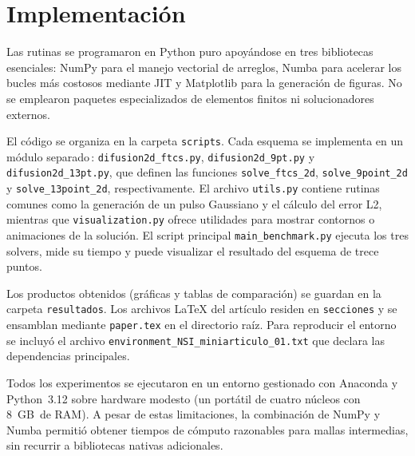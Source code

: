 \section{Implementaci\'on}
Las rutinas se programaron en Python puro apoy\'andose en tres bibliotecas
esenciales: NumPy para el manejo vectorial de arreglos, Numba para acelerar
los bucles m\'as costosos mediante JIT y Matplotlib para la generaci\'on de
figuras.  No se emplearon paquetes especializados de elementos finitos ni
solucionadores externos.

El c\'odigo se organiza en la carpeta \texttt{scripts}.  Cada esquema se
implementa en un m\'odulo separado\,: \texttt{difusion2d\_ftcs.py},
\texttt{difusion2d\_9pt.py} y \texttt{difusion2d\_13pt.py}, que definen las
funciones \texttt{solve\_ftcs\_2d}, \texttt{solve\_9point\_2d} y
\texttt{solve\_13point\_2d}, respectivamente.  El archivo
\texttt{utils.py} contiene rutinas comunes como la generaci\'on de un pulso
Gaussiano y el c\'alculo del error L2, mientras que
\texttt{visualization.py} ofrece utilidades para mostrar contornos o
animaciones de la soluci\'on.  El script principal
\texttt{main\_benchmark.py} ejecuta los tres solvers, mide su tiempo y puede
visualizar el resultado del esquema de trece puntos.

Los productos obtenidos (gr\'aficas y tablas de comparaci\'on) se guardan en la
carpeta \texttt{resultados}.  Los archivos \LaTeX{} del art\'iculo residen en
\texttt{secciones} y se ensamblan mediante \texttt{paper.tex} en el
directorio ra\'iz.  Para reproducir el entorno se incluy\'o el archivo
\texttt{environment\_NSI\_miniarticulo\_01.txt} que declara las dependencias
principales.

Todos los experimentos se ejecutaron en un entorno gestionado con Anaconda y
Python~3.12 sobre hardware modesto (un port\'atil de cuatro n\'ucleos con
8~GB~de RAM).  A pesar de estas limitaciones, la combinaci\'on de NumPy y
Numba permiti\'o obtener tiempos de c\'omputo razonables para mallas
intermedias, sin recurrir a bibliotecas nativas adicionales.
